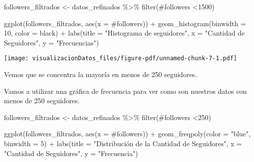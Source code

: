 \documentclass[
  letterpaper,
  DIV=11,
  numbers=noendperiod]{scrreprt}
\newenvironment{Shaded}{\begin{snugshade}}{\end{snugshade}}
\newcommand{\AttributeTok}[1]{\textcolor[rgb]{0.40,0.45,0.13}{#1}}
\newcommand{\DecValTok}[1]{\textcolor[rgb]{0.68,0.00,0.00}{#1}}
\newcommand{\FunctionTok}[1]{\textcolor[rgb]{0.28,0.35,0.67}{#1}}
\newcommand{\NormalTok}[1]{\textcolor[rgb]{0.00,0.23,0.31}{#1}}
\newcommand{\OtherTok}[1]{\textcolor[rgb]{0.00,0.23,0.31}{#1}}
\newcommand{\SpecialCharTok}[1]{\textcolor[rgb]{0.37,0.37,0.37}{#1}}
\newcommand{\StringTok}[1]{\textcolor[rgb]{0.13,0.47,0.30}{#1}}
\begin{document}
\begin{Shaded}
\begin{Highlighting}[]
\NormalTok{followers\_filtrados }\OtherTok{\textless{}{-}}\NormalTok{ datos\_refinados }\SpecialCharTok{\%\textgreater{}\%} \FunctionTok{filter}\NormalTok{(}\StringTok{\textasciigrave{}}\AttributeTok{\#followers}\StringTok{\textasciigrave{}} \SpecialCharTok{\textless{}}\DecValTok{1500}\NormalTok{)}

\FunctionTok{ggplot}\NormalTok{(followers\_filtrados, }\FunctionTok{aes}\NormalTok{(}\AttributeTok{x =} \StringTok{\textasciigrave{}}\AttributeTok{\#followers}\StringTok{\textasciigrave{}}\NormalTok{)) }\SpecialCharTok{+}
  \FunctionTok{geom\_histogram}\NormalTok{(}\AttributeTok{binwidth =} \DecValTok{10}\NormalTok{, }\AttributeTok{color =} \StringTok{\textquotesingle{}black\textquotesingle{}}\NormalTok{) }\SpecialCharTok{+}
    \FunctionTok{labs}\NormalTok{(}\AttributeTok{title =} \StringTok{"Histograma de seguidores"}\NormalTok{,}
       \AttributeTok{x =} \StringTok{"Cantidad de Seguidores"}\NormalTok{,}
       \AttributeTok{y =} \StringTok{"Frecuencias"}\NormalTok{)}
\end{Highlighting}
\end{Shaded}

\texttt{[image: visualizacionDatos\_files/figure-pdf/unnamed-chunk-7-1.pdf]}

Vemos que se concentra la mayoría en menos de 250 seguidores.

Vamos a utilizar una gráfica de frecuencia para ver como son nuestros
datos con menos de 250 seguidores.

\begin{Shaded}
\begin{Highlighting}[]
\NormalTok{followers\_filtrados }\OtherTok{\textless{}{-}}\NormalTok{ datos\_refinados }\SpecialCharTok{\%\textgreater{}\%}  \FunctionTok{filter}\NormalTok{(}\StringTok{\textasciigrave{}}\AttributeTok{\#followers}\StringTok{\textasciigrave{}} \SpecialCharTok{\textless{}}\DecValTok{250}\NormalTok{)}

\FunctionTok{ggplot}\NormalTok{(followers\_filtrados, }\FunctionTok{aes}\NormalTok{(}\AttributeTok{x =} \StringTok{\textasciigrave{}}\AttributeTok{\#followers}\StringTok{\textasciigrave{}}\NormalTok{)) }\SpecialCharTok{+}
  \FunctionTok{geom\_freqpoly}\NormalTok{(}\AttributeTok{color =} \StringTok{"blue"}\NormalTok{, }\AttributeTok{binwidth =} \DecValTok{5}\NormalTok{) }\SpecialCharTok{+}
  \FunctionTok{labs}\NormalTok{(}\AttributeTok{title =} \StringTok{"Distribución de la Cantidad de Seguidores"}\NormalTok{,}
       \AttributeTok{x =} \StringTok{"Cantidad de Seguidores"}\NormalTok{,}
       \AttributeTok{y =} \StringTok{"Frecuencia"}\NormalTok{) }
\end{Highlighting}
\end{Shaded}
\end{document}
